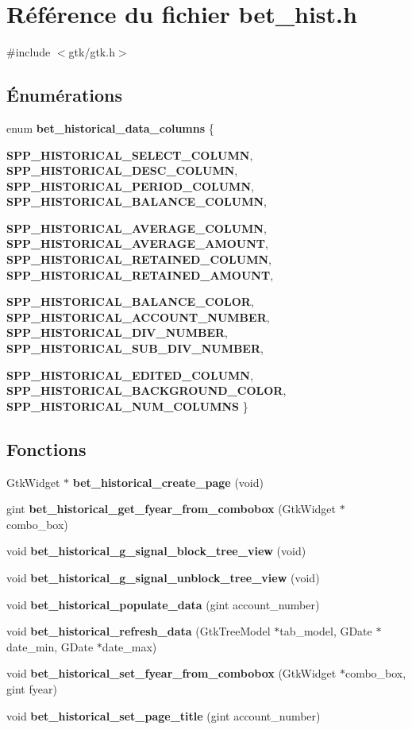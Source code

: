 \section{Référence du fichier bet\_\-hist.h}
\label{bet__hist_8h}
{\ttfamily \#include $<$gtk/gtk.h$>$}\par
\subsection*{Énumérations}
\begin{DoxyCompactItemize}
\item 
enum {\bf bet\_\-historical\_\-data\_\-columns} \{ \par
{\bf SPP\_\-HISTORICAL\_\-SELECT\_\-COLUMN}, 
{\bf SPP\_\-HISTORICAL\_\-DESC\_\-COLUMN}, 
{\bf SPP\_\-HISTORICAL\_\-PERIOD\_\-COLUMN}, 
{\bf SPP\_\-HISTORICAL\_\-BALANCE\_\-COLUMN}, 
\par
{\bf SPP\_\-HISTORICAL\_\-AVERAGE\_\-COLUMN}, 
{\bf SPP\_\-HISTORICAL\_\-AVERAGE\_\-AMOUNT}, 
{\bf SPP\_\-HISTORICAL\_\-RETAINED\_\-COLUMN}, 
{\bf SPP\_\-HISTORICAL\_\-RETAINED\_\-AMOUNT}, 
\par
{\bf SPP\_\-HISTORICAL\_\-BALANCE\_\-COLOR}, 
{\bf SPP\_\-HISTORICAL\_\-ACCOUNT\_\-NUMBER}, 
{\bf SPP\_\-HISTORICAL\_\-DIV\_\-NUMBER}, 
{\bf SPP\_\-HISTORICAL\_\-SUB\_\-DIV\_\-NUMBER}, 
\par
{\bf SPP\_\-HISTORICAL\_\-EDITED\_\-COLUMN}, 
{\bf SPP\_\-HISTORICAL\_\-BACKGROUND\_\-COLOR}, 
{\bf SPP\_\-HISTORICAL\_\-NUM\_\-COLUMNS}
 \}
\end{DoxyCompactItemize}
\subsection*{Fonctions}
\begin{DoxyCompactItemize}
\item 
GtkWidget $\ast$ {\bf bet\_\-historical\_\-create\_\-page} (void)
\item 
gint {\bf bet\_\-historical\_\-get\_\-fyear\_\-from\_\-combobox} (GtkWidget $\ast$combo\_\-box)
\item 
void {\bf bet\_\-historical\_\-g\_\-signal\_\-block\_\-tree\_\-view} (void)
\item 
void {\bf bet\_\-historical\_\-g\_\-signal\_\-unblock\_\-tree\_\-view} (void)
\item 
void {\bf bet\_\-historical\_\-populate\_\-data} (gint account\_\-number)
\item 
void {\bf bet\_\-historical\_\-refresh\_\-data} (GtkTreeModel $\ast$tab\_\-model, GDate $\ast$date\_\-min, GDate $\ast$date\_\-max)
\item 
void {\bf bet\_\-historical\_\-set\_\-fyear\_\-from\_\-combobox} (GtkWidget $\ast$combo\_\-box, gint fyear)
\item 
void {\bf bet\_\-historical\_\-set\_\-page\_\-title} (gint account\_\-number)
\end{DoxyCompactItemize}


